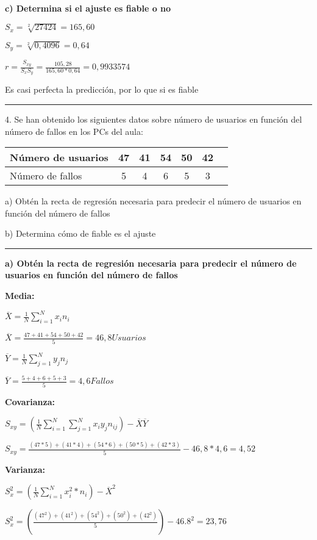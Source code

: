 \documentclass{article}
\begin{document}
\textbf{c) Determina si el ajuste es fiable o no}

\(S_{x} = \sqrt[2]{27424} = 165,60\)

\(S_{y} = \sqrt[2]{0,4096} = 0,64\)


\( r = \frac{S_{xy}}{S_{x} S_{y}} = \frac{105,28}{165,60 * 0,64} = 0,9933574\)

Es casi perfecta la predicci\'on, por lo que si es fiable 

\rule{119mm}{0.5mm}

4. Se han obtenido los siguientes datos sobre n\'umero de usuarios en funci\'on del n\'umero de fallos en los PCs del aula:

\begin{tabular}{|l|c|c|c|c|c|c|}
N\'umero de usuarios  & 47 & 41 & 54 & 50 & 42\\
\hline
N\'umero de fallos  & 5 & 4 & 6 & 5 & 3\\
\end{tabular}

a) Obt\'en la recta de regresi\'on necesaria para predecir el n\'umero de usuarios en funci\'on del n\'umero de fallos 

b) Determina c\'omo de fiable es el ajuste

\rule{119mm}{0.2mm}

\textbf{a) Obt\'en la recta de regresi\'on necesaria para predecir el n\'umero de usuarios en funci\'on del n\'umero de fallos}

\textbf{Media:}

\(\overline{X} = \frac{1}{N} \displaystyle\sum_{i=1}^{N} x_{i} n_{i}\)

\(\overline{X} = \frac{47 + 41 + 54 + 50 + 42}{5} = 46,8 Usuarios\)

\(\overline{Y} = \frac{1}{N} \displaystyle\sum_{j=1}^{N} y_{j} n_{j}\)

\(\overline{Y} = \frac{5 + 4 + 6 + 5 + 3}{5} = 4,6 Fallos\)

\textbf{Covarianza:}


\(S_{xy} = (\frac{1}{N} \displaystyle\sum_{i=1}^{N} \displaystyle\sum_{j=1}^{N} x_{i} y_{j} n_{ij}) - \overline{X} \overline{Y}\)

\(S_{xy} = \frac{(47*5) + (41*4) + (54*6) + (50*5) + (42*3)}{5} - 46,8 * 4,6 = 4,52\)

\textbf{Varianza:}

\(S_{x}^2  = (\frac{1}{N} \displaystyle\sum_{i=1}^{N} x_{i} ^2 * n_{i}) - \overline{X}^2\)

\(S_{x}^2 = (\frac{(47^2) + (41^2) + (54^2) + (50^2) + (42^2) }{5}) - 46.8^2 = 23,76\)
\end{document}
